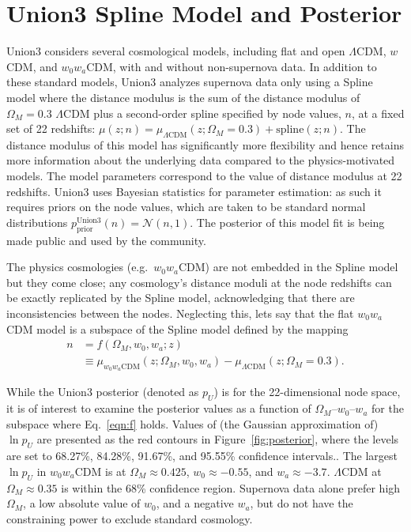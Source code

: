 \documentclass[11pt,a4paper]{article}
\begin{document}
\section{Union3 Spline Model and Posterior}
\label{sec:union3}
Union3 considers several cosmological models, including  flat and open $\Lambda$CDM, $w$CDM, and $w_0w_a$CDM,
with and without non-supernova data.
In addition to these standard models,  Union3 analyzes supernova data only using a Spline model where the  distance modulus
is the sum of the distance modulus of $\Omega_M=0.3$  $\Lambda$CDM plus a second-order spline specified by node values, $n$,
at a fixed set of 22 redshifts: $\mu(z;n) = \mu_{\Lambda \text{CDM}}(z;\Omega_M=0.3) + \text{spline}(z;n)$.  The distance modulus of this model has significantly more flexibility 
and hence retains more information about the underlying data compared to the physics-motivated models.
The model parameters correspond to the value of distance modulus at 22 redshifts.
Union3 uses Bayesian statistics for parameter estimation: as such it requires 
priors on the node values, which are taken to be standard normal distributions
$p^\text{Union3}_\text{prior}(n)=  \mathcal{N}(n,1)$.
The posterior of this model fit is being made public and used by the community.

The physics cosmologies (e.g.\ $w_0w_a$CDM)  are not embedded in the Spline model but 
they come close; any cosmology's distance moduli at the node redshifts can be exactly replicated by the Spline model, acknowledging that
there are
inconsistencies between the nodes.  Neglecting this, lets say that the flat $w_0w_a$CDM model
is a subspace of the Spline model defined by the mapping
\begin{align}
	n &= f(\Omega_M, w_0, w_a; z) \\
	& \equiv \mu_{w_0 w_a \text{CDM}}(z;\Omega_M, w_0, w_a)  - \mu_{\Lambda \text{CDM}}(z;\Omega_M=0.3). \label{eqn:f}
\end{align}

While the Union3 posterior (denoted as $p_U$) is for the 22-dimensional node space, it is of interest to examine the posterior values 
as a function of $\Omega_M$--$w_0$--$w_a$ for the
subspace where Eq.~\ref{eqn:f} holds. 
Values of (the Gaussian approximation of) $\ln{p_U}$
 are presented as the red contours in Figure~\ref{fig:posterior}, where the levels are set to 68.27\%, 84.28\%, 91.67\%, and 95.55\% confidence intervals..
The largest $\ln{p_U}$ in $w_0w_a$CDM is at $\Omega_M\approx 0.425$, $w_0 \approx -0.55$, and $w_a \approx -3.7$. $\Lambda$CDM at $\Omega_M \approx 0.35$ is within the 68\% confidence region.
Supernova data alone prefer high $\Omega_M$, a low absolute value of $w_0$, and a negative $w_a$, but do not have
the constraining power to exclude standard cosmology.
\end{document}

